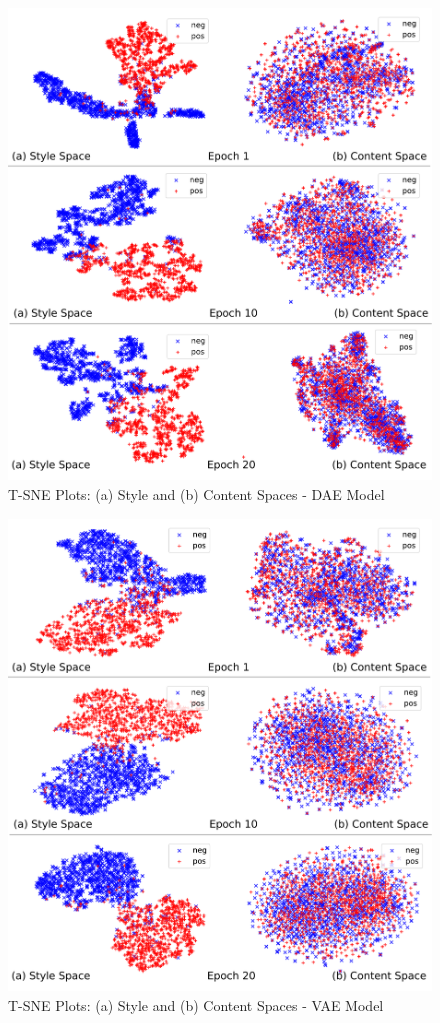\documentclass[11pt,a4paper]{article}
\begin{document}
\begin{figure}[ht]
	\captionsetup{justification=centering}
	\includegraphics[width=\linewidth]{latent-spaces-dae}
	\caption{T-SNE Plots: (a) Style and (b) Content Spaces - DAE Model}
	\label{fig:dae-tsne}
\end{figure}

\begin{figure}[ht]
	\captionsetup{justification=centering}
	\includegraphics[width=\linewidth]{latent-spaces-vae}
	\caption{T-SNE Plots: (a) Style and (b) Content Spaces - VAE Model}
	\label{fig:vae-tsne}
\end{figure}
\end{document}
